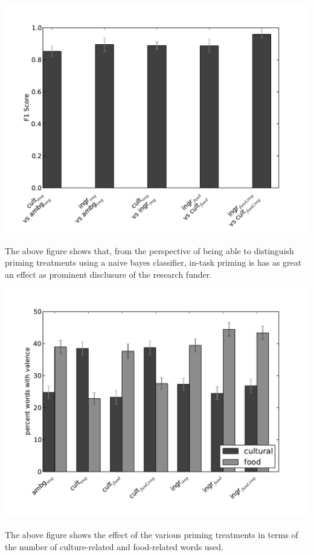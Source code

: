 \documentclass[letterpaper]{article}
\begin{document}
\begin{center}
\includegraphics[scale=0.65]{../figs/cross-classification.pdf}
\end{center}
The above figure shows that, from the perspective of being able to distinguish
priming treatments using a naive bayes classifier, in-task priming is has as
great an effect as prominent disclusure of the research funder.

\begin{center}
\includegraphics[scale=0.65]{../figs/valenceComparison.pdf}
\end{center}
The above figure shows the effect of the various priming treatments in terms
of the number of culture-related and food-related words used.
\end{document}
